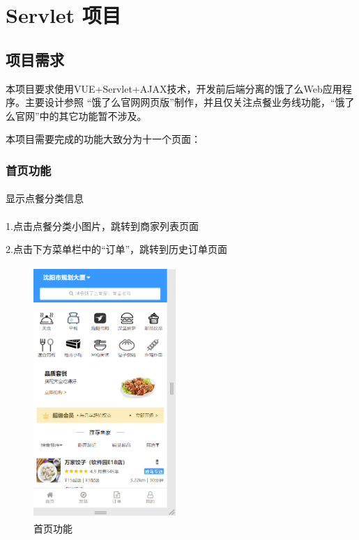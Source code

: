 
\chapter{Servlet 项目}

\section{项目需求}

本项目要求使用VUE+Servlet+AJAX技术，开发前后端分离的饿了么Web应用程序。主要设计参照 “饿了么官网网页版”制作，并且仅关注点餐业务线功能，“饿了么官网”中的其它功能暂不涉及。

本项目需要完成的功能大致分为十一个页面：

\subsection{首页功能}
\subsubsection*{}
显示点餐分类信息
\subsubsection*{}
1.点击点餐分类小图片，跳转到商家列表页面

2.点击下方菜单栏中的“订单”，跳转到历史订单页面
\begin{figure}[H]
    \centering
    \includegraphics[width=5.4cm,height=9.6cm]{figures/3.1.1.png}
    \caption{首页功能}
\end{figure}

